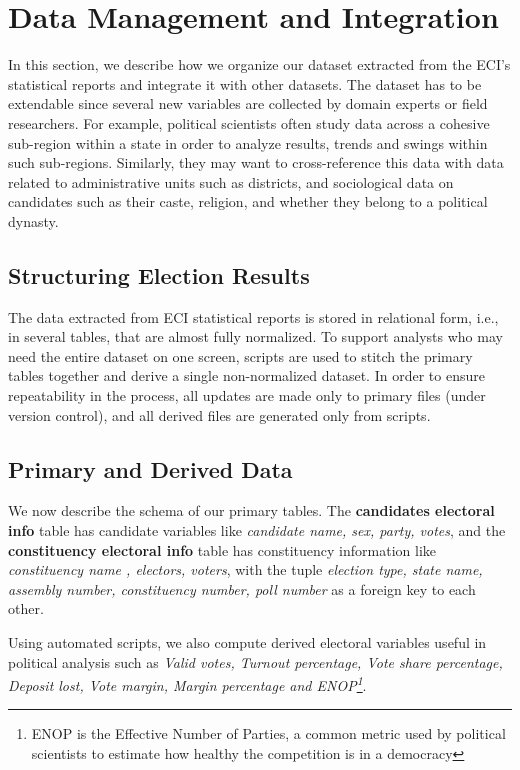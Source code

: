 
\section{Data Management and Integration}\label{sec:datamanagement}

In this section, we describe how we organize our dataset extracted from the ECI's statistical reports and integrate it with other datasets. The dataset has to be extendable since several new variables are collected by domain experts or field researchers. For example, political scientists often study data across a cohesive sub-region within a state in order to analyze results, trends and swings within such sub-regions. Similarly, they may want to cross-reference this data with data related to administrative units such as districts, and sociological data on candidates such as their caste, religion, and whether they belong to a political dynasty.

\subsection{Structuring Election Results}

The data extracted from ECI statistical reports is stored in relational form, i.e., in several tables, that are almost fully normalized. To support analysts who may need the entire dataset on one screen, scripts are used to stitch the primary tables together and derive a single non-normalized dataset. In order to ensure repeatability in the process, all updates are made only to primary files (under version control), and all derived files are generated only from scripts.

\subsection{Primary and Derived Data}

We now describe the schema of our primary tables. The \textbf{candidates electoral info} table has candidate variables like \emph{candidate name, sex, party, votes}, and the \textbf{constituency electoral info} table has constituency information like \emph{constituency name , electors, voters}, with the tuple \emph{election type, state name, assembly number, constituency number, poll number} as a foreign key to each other.

Using automated scripts, we also compute derived electoral variables useful in political analysis such as \emph{Valid votes, Turnout percentage, Vote share percentage, Deposit lost, Vote margin, Margin percentage and ENOP\footnote{ENOP is the Effective Number of Parties, a common metric used by political scientists to estimate how healthy the competition is in a democracy}}.

